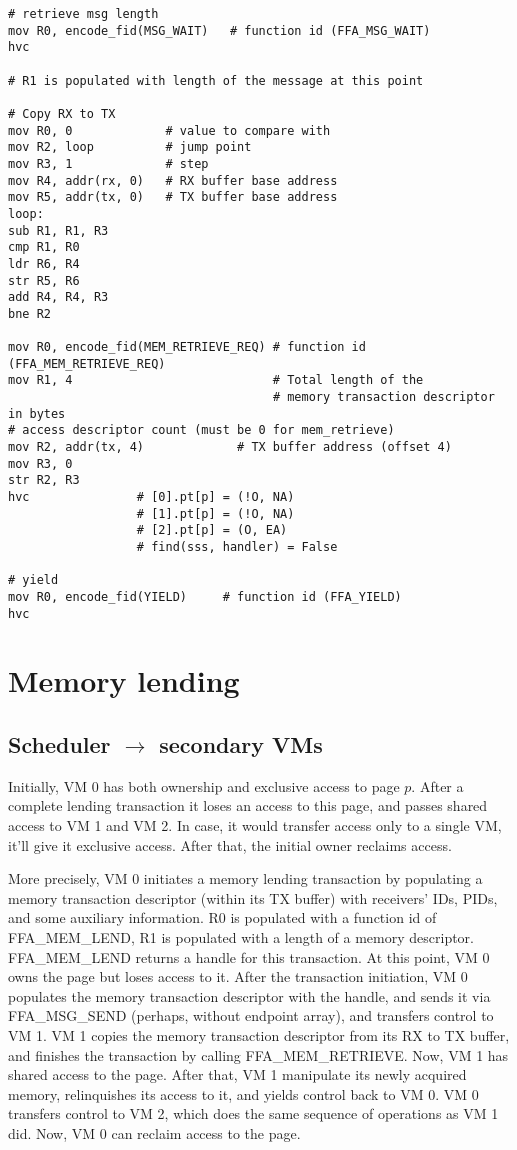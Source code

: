 \documentclass{article}
\begin{document}
\begin{lstlisting}[caption={VM 2}]
# retrieve msg length
mov R0, encode_fid(MSG_WAIT)   # function id (FFA_MSG_WAIT)
hvc

# R1 is populated with length of the message at this point

# Copy RX to TX
mov R0, 0             # value to compare with
mov R2, loop          # jump point
mov R3, 1             # step
mov R4, addr(rx, 0)   # RX buffer base address
mov R5, addr(tx, 0)   # TX buffer base address
loop:
sub R1, R1, R3
cmp R1, R0
ldr R6, R4
str R5, R6
add R4, R4, R3
bne R2

mov R0, encode_fid(MEM_RETRIEVE_REQ) # function id (FFA_MEM_RETRIEVE_REQ)
mov R1, 4                            # Total length of the  
                                     # memory transaction descriptor in bytes
# access descriptor count (must be 0 for mem_retrieve)
mov R2, addr(tx, 4)             # TX buffer address (offset 4)
mov R3, 0
str R2, R3                                    
hvc               # [0].pt[p] = (!O, NA)            
                  # [1].pt[p] = (!O, NA)
                  # [2].pt[p] = (O, EA)
                  # find(sss, handler) = False
                  
# yield
mov R0, encode_fid(YIELD)     # function id (FFA_YIELD)
hvc
\end{lstlisting}

\section{Memory lending}

\subsection{Scheduler $\rightarrow$ secondary VMs}

Initially, VM 0 has both ownership and exclusive access to page $p$. After a complete lending transaction it loses an access to this page, and passes shared access to VM 1 and VM 2. In case, it would transfer access only to a single VM, it'll give it exclusive access. After that, the initial owner reclaims access.

More precisely, VM 0 initiates a memory lending transaction by populating a memory transaction descriptor (within its TX buffer) with receivers' IDs, PIDs, and some auxiliary information. R0 is populated with a function id of FFA\_MEM\_LEND, R1 is populated with a length of a memory descriptor. FFA\_MEM\_LEND returns a handle for this transaction. At this point, VM 0 owns the page but loses access to it. After the transaction initiation, VM 0 populates the memory transaction descriptor with the handle, and sends it via FFA\_MSG\_SEND (perhaps, without endpoint array), and transfers control to VM 1. VM 1 copies the memory transaction descriptor from its RX to TX buffer, and finishes the transaction by calling FFA\_MEM\_RETRIEVE. Now, VM 1 has shared access to the page. After that, VM 1 manipulate its newly acquired memory, relinquishes its access to it, and yields control back to VM 0. VM 0 transfers control to VM 2, which does the same sequence of operations as VM 1 did. Now, VM 0 can reclaim access to the page.
\end{document}
